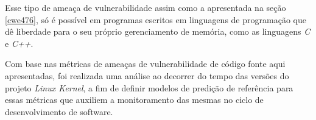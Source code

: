 Esse tipo de ameaça de vulnerabilidade assim como a apresentada na seção
\ref{cwe476}, só é possível em programas escritos em linguagens de programação
que dê liberdade para o seu próprio gerenciamento de memória, como as linguagens
\textit{C} e \textit{C++}.



Com base nas métricas de ameaças de vulnerabilidade de código fonte aqui
apresentadas, foi realizada uma análise ao decorrer do tempo das versões do
projeto \textit{Linux Kernel}, a fim de definir modelos de predição de
referência para essas métricas que auxiliem a monitoramento das mesmas no ciclo
de desenvolvimento de software.


